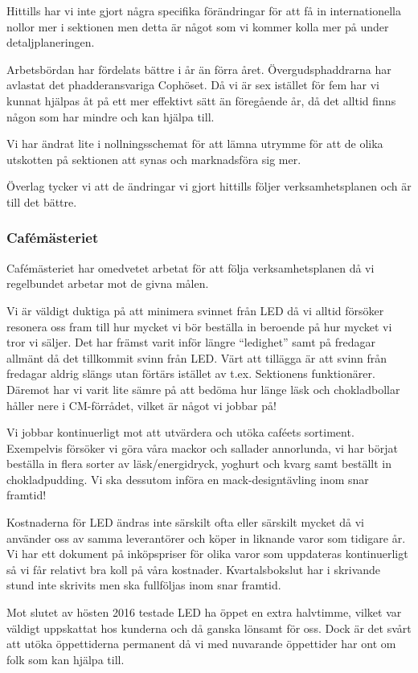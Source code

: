 \documentclass[../_main/handlingar.tex]{subfiles}
\begin{document}
Hittills har vi inte gjort några specifika förändringar för att få in internationella nollor mer i sektionen men detta är något som vi kommer kolla mer på under detaljplaneringen.

Arbetsbördan har fördelats bättre i år än förra året. Övergudsphaddrarna har avlastat det phadderansvariga Cophöset. Då vi är sex istället för fem har vi kunnat hjälpas åt på ett mer effektivt sätt än föregående år, då det alltid finns någon som har mindre och kan hjälpa till.

Vi har ändrat lite i nollningsschemat för att lämna utrymme för att de olika utskotten på sektionen att synas och marknadsföra sig mer.

Överlag tycker vi att de ändringar vi gjort hittills följer verksamhetsplanen och är till det bättre.

\subsubsection*{Cafémästeriet}
Cafémästeriet har omedvetet arbetat för att följa verksamhetsplanen då vi regelbundet arbetar mot de givna målen.

Vi är väldigt duktiga på att minimera svinnet från LED då vi alltid försöker resonera oss fram till hur mycket vi bör beställa in beroende på hur mycket vi tror vi säljer. Det har främst varit inför längre “ledighet” samt på fredagar allmänt då det tillkommit svinn från LED. Värt att tillägga är att svinn från fredagar aldrig slängs utan förtärs istället av t.ex. Sektionens funktionärer. Däremot har vi varit lite sämre på att bedöma hur länge läsk och chokladbollar håller nere i CM-förrådet, vilket är något vi jobbar på!

Vi jobbar kontinuerligt mot att utvärdera och utöka caféets sortiment. Exempelvis försöker vi göra våra mackor och sallader annorlunda, vi har börjat beställa in flera sorter av läsk/energidryck, yoghurt och kvarg samt beställt in chokladpudding. Vi ska dessutom införa en mack-designtävling inom snar framtid!

Kostnaderna för LED ändras inte särskilt ofta eller särskilt mycket då vi använder oss av samma leverantörer och köper in liknande varor som tidigare år. Vi har ett dokument på inköpspriser för olika varor som uppdateras kontinuerligt så vi får relativt bra koll på våra kostnader. Kvartalsbokslut har i skrivande stund inte skrivits men ska fullföljas inom snar framtid.

Mot slutet av hösten 2016 testade LED ha öppet en extra halvtimme, vilket var väldigt uppskattat hos kunderna och då ganska lönsamt för oss. Dock är det svårt att utöka öppettiderna permanent då vi med nuvarande öppettider har ont om folk som kan hjälpa till.
\end{document}
